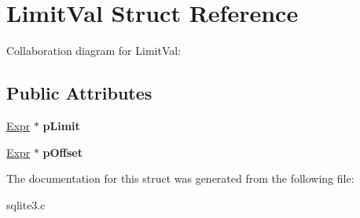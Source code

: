 \hypertarget{structLimitVal}{}\section{Limit\+Val Struct Reference}
\label{structLimitVal}


Collaboration diagram for Limit\+Val\+:
\subsection*{Public Attributes}
\begin{DoxyCompactItemize}
\item 
\hyperlink{structExpr}{Expr} $\ast$ {\bfseries p\+Limit}\hypertarget{structLimitVal_a96094d1b395a3f455263ff5907d72ed6}{}\label{structLimitVal_a96094d1b395a3f455263ff5907d72ed6}

\item 
\hyperlink{structExpr}{Expr} $\ast$ {\bfseries p\+Offset}\hypertarget{structLimitVal_a43dedf453a8e5cb8091fcde524a7c736}{}\label{structLimitVal_a43dedf453a8e5cb8091fcde524a7c736}

\end{DoxyCompactItemize}


The documentation for this struct was generated from the following file\+:\begin{DoxyCompactItemize}
\item 
sqlite3.\+c\end{DoxyCompactItemize}
